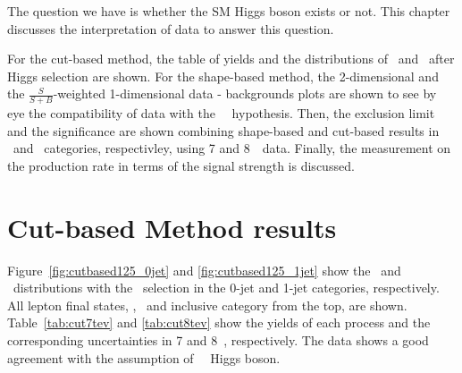 The question we have is whether the SM Higgs boson exists or not.  
This chapter discusses the interpretation of data to answer this question.

For the cut-based method, the table of yields and the distributions 
of \mT\ and \mll\ after Higgs selection are shown. 
For the shape-based method, the 2-dimensional and the $\frac{S}{S+B}$-weighted 1-dimensional
data - backgrounds plots are shown to see by eye the 
compatibility of data with the ~\GeV\ hypothesis. 
Then, the exclusion limit and the significance are shown combining 
shape-based and cut-based results in \DF\ and \SF\ categories, respectivley, 
using 7 and 8~\TeV\ data. Finally, the measurement on the 
production rate in terms of the signal strength is discussed. 

\section{Cut-based Method results}  

Figure~\ref{fig:cutbased125_0jet} and \ref{fig:cutbased125_1jet} show the
\mT\ and \mll\ distributions with the  \GeV\ selection 
in the 0-jet and 1-jet categories, respectively. 
All lepton final states, \DF, \SF\ and inclusive category from the top, are shown. 
Table~\ref{tab:cut7tev} and \ref{tab:cut8tev} show the yields of each process 
and the corresponding uncertainties%
in 7 and 8~\TeV, respectively.
The data shows a good agreement with the assumption of ~\GeV\ Higgs boson. 


